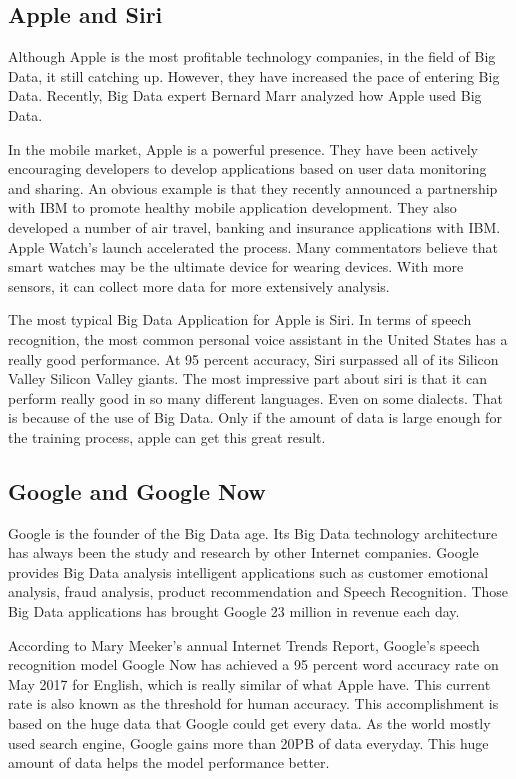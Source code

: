 \documentclass[sigconf]{acmart}
\begin{document}
\subsection{Apple and Siri}
Although Apple is the most profitable technology companies, in the field of Big Data, it still catching up. However, they have increased the pace of entering Big Data. Recently, Big Data expert Bernard Marr analyzed how Apple used Big Data\cite{siri}.

In the mobile market, Apple is a powerful presence. They have been actively encouraging developers to develop applications based on user data monitoring and sharing. An obvious example is that they recently announced a partnership with IBM to promote healthy mobile application development. They also developed a number of air travel, banking and insurance applications with IBM. Apple Watch's launch accelerated the process. Many commentators believe that smart watches may be the ultimate device for wearing devices. With more sensors, it can collect more data for more extensively analysis.

The most typical Big Data Application for Apple is Siri. In terms of speech recognition, the most common personal voice assistant in the United States has a really good performance. At 95 percent accuracy, Siri surpassed all of its Silicon Valley Silicon Valley giants. The most impressive part about siri is that it can perform really good in so many different languages. Even on some dialects. That is because of the use of Big Data. Only if the amount of data is large enough for the training process, apple can get this great result.

\subsection{Google and Google Now}
Google is the founder of the Big Data age. Its Big Data technology architecture has always been the study and research by other  Internet companies. Google provides Big Data analysis intelligent applications such as customer emotional analysis, fraud analysis, product recommendation and Speech Recognition. Those Big Data applications has brought Google 23 million in revenue each day.

According to Mary Meeker's annual Internet Trends Report\cite{google}, Google's speech recognition model Google Now has achieved a 95 percent word accuracy rate on May 2017 for English, which is really similar of what Apple have. This current rate is also known as the threshold for human accuracy. This accomplishment is based on the huge data that Google could get every data. As the world mostly used search engine, Google gains more than 20PB of data everyday. This huge amount of data helps the model performance better.
\end{document}
